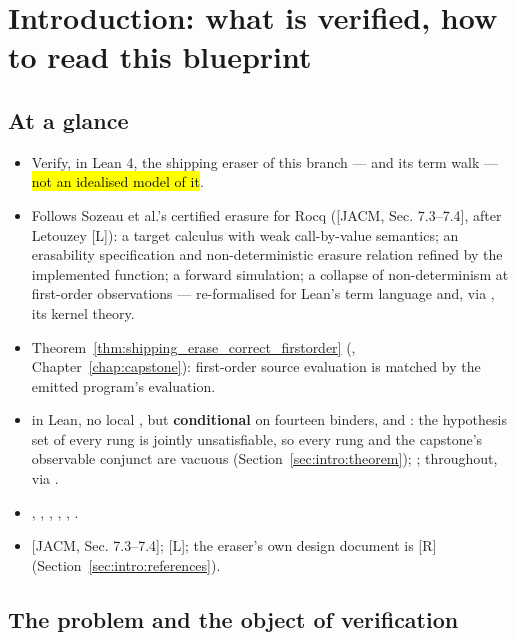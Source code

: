 \chapter{Introduction: what is verified, how to read this blueprint}
\label{chap:intro}

\section*{At a glance}
\begin{itemize}
\item {} Verify, in Lean 4, the shipping  eraser of this branch ---
 and its term walk  --- \hl{not an idealised model of it}.
\item {} Follows Sozeau et al.'s certified erasure for Rocq ([JACM, Sec. 7.3--7.4],
after Letouzey [L]): a target calculus with weak call-by-value semantics; an erasability
specification and non-deterministic erasure relation refined by the implemented function; a forward
simulation; a collapse of non-determinism at first-order observations --- re-formalised for Lean's
term language and, via , its kernel theory.
\item {} Theorem~\ref{thm:shipping_erase_correct_firstorder}
(, Chapter~\ref{chap:capstone}): first-order source evaluation
is matched by the emitted program's evaluation.
\item {} \stProved{} in Lean, no local , but \textbf{conditional} on fourteen
binders, and \stOpen{}: the hypothesis set of every rung is jointly unsatisfiable, so every rung and
the capstone's observable conjunct are vacuous (Section~\ref{sec:intro:theorem}); \stAssumed{}
; \stInherited{} throughout, via .
\item {} , , ,
, , .
\item {} [JACM, Sec. 7.3--7.4]; [L]; the eraser's own design document is [R]
(Section~\ref{sec:intro:references}).
\end{itemize}

\section{The problem and the object of verification}
\label{sec:intro:problem}

